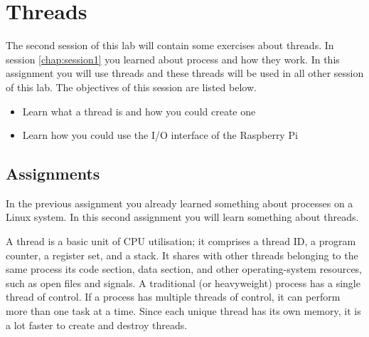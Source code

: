 \chapter[Session 2: Thread]{Threads}\label{chap:session2}
The second session of this lab will contain some exercises about threads. In session \ref{chap:session1} you learned about process and how they work. In this assignment you will use threads and these threads will be used in all other session of this lab. The objectives of this session are listed below.
	\begin{itemize}
		\item Learn what a thread is and how you could create one
		\item Learn how you could use the I/O interface of the Raspberry Pi
	\end{itemize}

\section{Assignments}
In the previous assignment you already learned something about processes on a Linux system. In this second assignment you will learn something about threads. 

A thread is a basic unit of CPU utilisation; it comprises a thread ID, a program counter, a register set, and a stack. It shares with other threads belonging to the same process its code section, data section, and other operating-system resources, such as open files and signals. A traditional (or heavyweight) process has a single thread of control. If a process has multiple threads of control, it can perform more than one task at a time. Since each unique thread has its own memory, it is a lot faster to create and destroy threads. 

